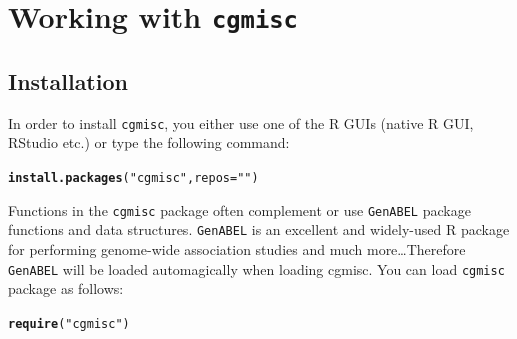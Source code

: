 \documentclass[12pt,a4paper,oneside]{article}\usepackage[]{graphicx}\usepackage[]{color}
\makeatletter
\newcommand{\hlstr}[1]{\textcolor[rgb]{0.192,0.494,0.8}{#1}}%
\newcommand{\hlstd}[1]{\textcolor[rgb]{0.345,0.345,0.345}{#1}}%
\newcommand{\hlkwc}[1]{\textcolor[rgb]{0.333,0.667,0.333}{#1}}%
\newcommand{\hlkwd}[1]{\textcolor[rgb]{0.737,0.353,0.396}{\textbf{#1}}}%
\newenvironment{kframe}{%
 \def\at@end@of@kframe{}%
 \ifinner\ifhmode%
  \def\at@end@of@kframe{\end{minipage}}%
  \begin{minipage}{\columnwidth}%
 \fi\fi%
 \def\FrameCommand##1{\hskip\@totalleftmargin \hskip-\fboxsep
 \colorbox{shadecolor}{##1}\hskip-\fboxsep
     \hskip-\linewidth \hskip-\@totalleftmargin \hskip\columnwidth}%
 \MakeFramed {\advance\hsize-\width
   \@totalleftmargin\z@ \linewidth\hsize
   \@setminipage}}%
 {\par\unskip\endMakeFramed%
 \at@end@of@kframe}
\newenvironment{knitrout}{}{} %
\makeatother
\begin{document}
\section*{Working with \texttt{cgmisc}}
\subsection*{Installation}
\noindent In order to install \texttt{cgmisc}, you either use one of the R GUIs (native R GUI, RStudio etc.) or type the following command:

\begin{knitrout}\footnotesize
{}\color{fgcolor}\begin{kframe}
\begin{alltt}
 \hlkwd{install.packages}\hlstd{(}\hlstr{"cgmisc"}\hlstd{,} \hlkwc{repos}\hlstd{=}\hlstr{""}\hlstd{)}
\end{alltt}
\end{kframe}
\end{knitrout}

\noindent Functions in the \texttt{cgmisc} package often complement or use \texttt{GenABEL} package functions and data structures. \texttt{GenABEL} is an excellent and widely-used R package for performing genome-wide association studies and much more\dots Therefore \texttt{GenABEL} will be loaded automagically when loading cgmisc. You can load \texttt{cgmisc} package as follows:

\begin{knitrout}\footnotesize
{}\color{fgcolor}\begin{kframe}
\begin{alltt}
\hlkwd{require}\hlstd{(}\hlstr{"cgmisc"}\hlstd{)}
\end{alltt}
\end{kframe}
\end{knitrout}
\end{document}
